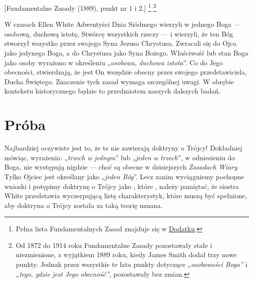 
[Fundamentalne Zasady (1889), punkt nr 1 i 2.] \footnote{Pełna lista Fundamentalnych Zasad znajduje się w \hyperref[chap:appendix]{Dodatku}.} \footnote{Od 1872 do 1914 roku Fundamentalne Zasady pozostawały stałe i niezmienione, z wyjątkiem 1889 roku, kiedy James Smith dodał trzy nowe punkty. Jednak przez wszystkie te lata punkty dotyczące \textit{„osobowości Boga”} i \textit{„tego, gdzie jest Jego obecność”}, pozostawały bez zmian.}

W czasach Ellen White Adwentyści Dnia Siódmego wierzyli w jednego Boga — osobową, duchową istotę, Stwórcę wszystkich rzeczy — i wierzyli, że ten Bóg stworzył wszystko przez swojego Syna Jezusa Chrystusa. Zwracali się do Ojca jako jedynego Boga, a do Chrystusa jako Syna Bożego. Właściwość lub stan Boga jako osoby wyrażono w określeniu „\textit{osobowa, duchowa istota}”. Co do Jego obecności,  stwierdzają, że jest On wszędzie obecny przez swojego przedstawiciela, Ducha Świętego. Znaczenie tych zasad wymaga szczególnej uwagi. W obrębie kontekstu historycznego będzie to przedmiotem naszych dalszych badań.

\section*{Próba}

Najbardziej oczywiste jest to, że te  nie zawierają doktryny o Trójcy! Dokładniej mówiąc, wyrażenia: „\textit{trzech w jednym}” lub „\textit{jeden w trzech}”, w odniesieniu do Boga, nie występują nigdzie — choć są obecne w dzisiejszych \textit{Zasadach Wiary}. Tylko Ojciec jest określany jako „\textit{jeden Bóg}”. Lecz zanim wyciągniemy pochopne wnioski i potępimy doktrynę o Trójcy jako , które , należy pamiętać, że siostra White przedstawia wyczerpującą listę charakterystyk, które muszą być spełnione, aby doktryna o Trójcy została za taką teorię uznana.

